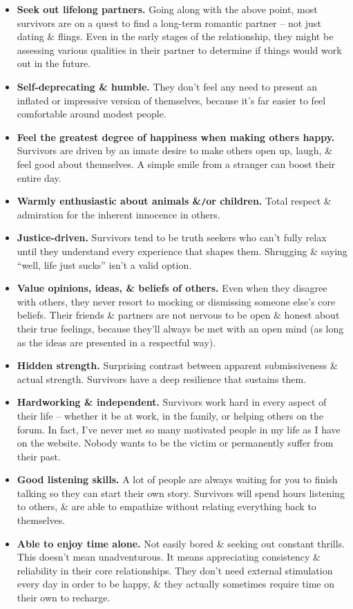 \documentclass{article}
\numberwithin{equation}{section}
\begin{document}
\begin{itemize}
	\item \textbf{Seek out lifelong partners.} Going along with the above point, most survivors are on a quest to find a long-term romantic partner -- not just dating \& flings. Even in the early stages of the relationship, they might be assessing various qualities in their partner to determine if things would work out in the future.
	\item \textbf{Self-deprecating \& humble.} They don't feel any need to present an inflated or impressive version of themselves, because it's far easier to feel comfortable around modest people.
	\item \textbf{Feel the greatest degree of happiness when making others happy.} Survivors are driven by an innate desire to make others open up, laugh, \& feel good about themselves. A simple smile from a stranger can boost their entire day.
	\item \textbf{Warmly enthusiastic about animals \&{\tt/}or children.} Total respect \& admiration for the inherent innocence in others.
	\item \textbf{Justice-driven.} Survivors tend to be truth seekers who can't fully relax until they understand every experience that shapes them. Shrugging \& saying ``well, life just sucks'' isn't a valid option.
	\item \textbf{Value opinions, ideas, \& beliefs of others.} Even when they disagree with others, they never resort to mocking or dismissing someone else's core beliefs. Their friends \& partners are not nervous to be open \& honest about their true feelings, because they'll always be met with an open mind (as long as the ideas are presented in a respectful way).
	\item \textbf{Hidden strength.} Surprising contrast between apparent submissiveness \& actual strength. Survivors have a deep resilience that sustains them.
	\item \textbf{Hardworking \& independent.} Survivors work hard in every aspect of their life -- whether it be at work, in the family, or helping others on the forum. In fact, I've never met so many motivated people in my life as I have on the website. Nobody wants to be the victim or permanently suffer from their past.
	\item \textbf{Good listening skills.} A lot of people are always waiting for you to finish talking so they can start their own story. Survivors will spend hours listening to others, \& are able to empathize without relating everything back to themselves.
	\item \textbf{Able to enjoy time alone.} Not easily bored \& seeking out constant thrills. This doesn't mean unadventurous. It means appreciating consistency \& reliability in their core relationships. They don't need external stimulation every day in order to be happy, \& they actually sometimes require time on their own to recharge.

\end{itemize}
\end{document}
